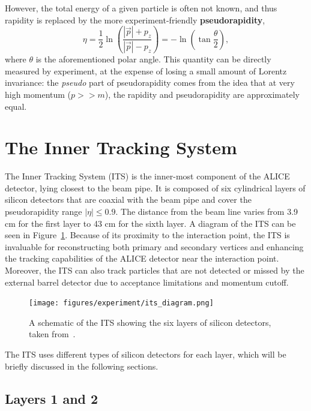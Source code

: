 However, the total energy of a given particle is often not known, and thus rapidity is replaced by the more experiment-friendly \textbf{pseudorapidity}, 
\begin{equation}
    \eta = \frac{1}{2} \ln \left( \frac{|\vec{p}| + p_{z}}{|\vec{p}| - p_{z}} \right) 
        = -\ln \left( \tan \frac{\theta}{2} \right),
\end{equation}
where $\theta$ is the aforementioned polar angle. This quantity can be directly measured by experiment, at the expense of losing a small amount of Lorentz invariance: the \textit{pseudo} part of pseudorapidity comes from the idea that at very high momentum ($p >> m$), the rapidity and pseudorapidity are approximately equal.

\section{The Inner Tracking System}

The Inner Tracking System (ITS) is the inner-most component of the ALICE detector, lying closest to the beam pipe. It is composed of six cylindrical layers of silicon detectors that are coaxial with the beam pipe and cover the pseudorapidity range $|\eta| \leq 0.9$. The distance from the beam line varies from 3.9 cm for the first layer to 43 cm for the sixth layer. A diagram of the ITS can be seen in Figure~\ref{fig:its_schematic}. Because of its proximity to the interaction point, the ITS is invaluable for reconstructing both primary and secondary vertices and enhancing the tracking capabilities of the ALICE detector near the interaction point. Moreover, the ITS can also track particles that are not detected or missed by the external barrel detector due to acceptance limitations and momentum cutoff. 

\begin{figure}
    \centering
    \texttt{[image: figures/experiment/its\_diagram.png]}
    \caption{A schematic of the ITS showing the six layers of silicon detectors, taken from~\cite{ITSDiagram}.}
    \label{fig:its_schematic}
\end{figure}

The ITS uses different types of silicon detectors for each layer, which will be briefly discussed in the following sections.

\subsection{Layers 1 and 2}

